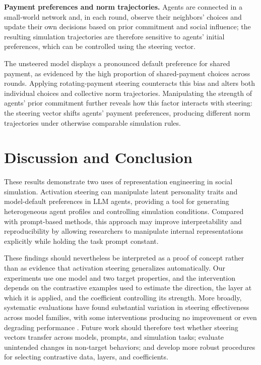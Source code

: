 \documentclass[onecolumn]{../../../../../template/Research-project-manuscript-template/main}
\begin{document}
\textbf{Payment preferences and norm trajectories.} Agents are connected in a small-world network and, in each round, observe their neighbors' choices and update their own decisions based on prior commitment and social influence; the resulting simulation trajectories are therefore sensitive to agents' initial preferences, which can be controlled using the steering vector.

The unsteered model displays a pronounced default preference for shared payment, as evidenced by the high proportion of shared-payment choices across rounds. Applying rotating-payment steering counteracts this bias and alters both individual choices and collective norm trajectories. Manipulating the strength of agents' prior commitment further reveals how this factor interacts with steering: the steering vector shifts agents' payment preferences, producing different norm trajectories under otherwise comparable simulation rules.

\section{Discussion and Conclusion}
These results demonstrate two uses of representation engineering in social simulation. Activation steering can manipulate latent personality traits and model-default preferences in LLM agents, providing a tool for generating heterogeneous agent profiles and controlling simulation conditions. Compared with prompt-based methods, this approach may improve interpretability and reproducibility by allowing researchers to manipulate internal representations explicitly while holding the task prompt constant.

These findings should nevertheless be interpreted as a proof of concept rather than as evidence that activation steering generalizes automatically. Our experiments use one model and two target properties, and the intervention depends on the contrastive examples used to estimate the direction, the layer at which it is applied, and the coefficient controlling its strength. More broadly, systematic evaluations have found substantial variation in steering effectiveness across model families, with some interventions producing no improvement or even degrading performance \citep{dasilva2025}. Future work should therefore test whether steering vectors transfer across models, prompts, and simulation tasks; evaluate unintended changes in non-target behaviors; and develop more robust procedures for selecting contrastive data, layers, and coefficients.



\end{document}
